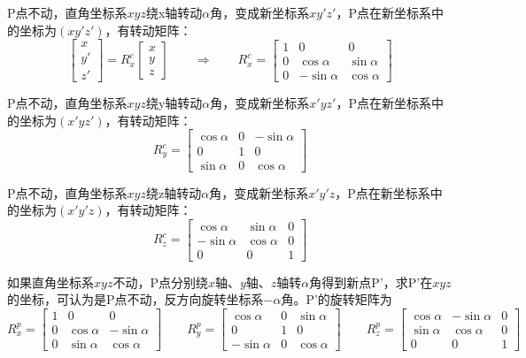 \documentclass[11pt, a4paper]{article}  %
\begin{document}
\begin{CJK}{UTF8}{gbsn}
P点不动，直角坐标系$xyz$绕x轴转动$\alpha$角，变成新坐标系$xy'z'$，P点在新坐标系中的坐标为$(xy{'}z{'})$，有转动矩阵：
\begin{equation}
\begin{bmatrix} x \\ y' \\ z' \end{bmatrix} = R_x^c \begin{bmatrix} x \\ y \\ z \end{bmatrix} \qquad \Rightarrow \qquad R_x^c = \begin{bmatrix} 1 & 0 & 0 \\ 0 & \cos\alpha & \sin\alpha \\ 0 & -\sin\alpha & \cos\alpha \end{bmatrix}
\end{equation} 

P点不动，直角坐标系$xyz$绕y轴转动$\alpha$角，变成新坐标系$x'yz'$，P点在新坐标系中的坐标为$(x'yz')$，有转动矩阵：
\begin{equation}
R_y^c = \begin{bmatrix} \cos\alpha & 0 & -\sin\alpha \\ 0 & 1 & 0 \\ \sin\alpha & 0 & \cos\alpha \end{bmatrix}
\end{equation} 

P点不动，直角坐标系$xyz$绕z轴转动$\alpha$角，变成新坐标系$x'y'z$，P点在新坐标系中的坐标为$(x'y'z)$，有转动矩阵：
\begin{equation}
R_z^c = \begin{bmatrix} \cos\alpha & \sin\alpha & 0 \\ -\sin\alpha & \cos\alpha & 0 \\ 0 & 0 & 1 \end{bmatrix}
\end{equation} 


如果直角坐标系$xyz$不动，P点分别绕$x$轴、$y$轴、$z$轴转$\alpha$角得到新点P'，求P'在$xyz$的坐标，可认为是P点不动，反方向旋转坐标系$-\alpha$角。P'的旋转矩阵为
\begin{equation}
	R_x^p = \begin{bmatrix} 1 & 0 & 0 \\ 0 & \cos\alpha & -\sin\alpha \\ 0 & \sin\alpha & \cos\alpha \end{bmatrix} \qquad 
	R_y^p = \begin{bmatrix} \cos\alpha & 0 & \sin\alpha \\ 0 & 1 & 0 \\ -\sin\alpha & 0 & \cos\alpha \end{bmatrix} \qquad
	R_z^p = \begin{bmatrix} \cos\alpha & -\sin\alpha & 0 \\ \sin\alpha & \cos\alpha & 0 \\ 0 & 0 & 1 \end{bmatrix}
\end{equation} 



\end{CJK}
\end{document}
